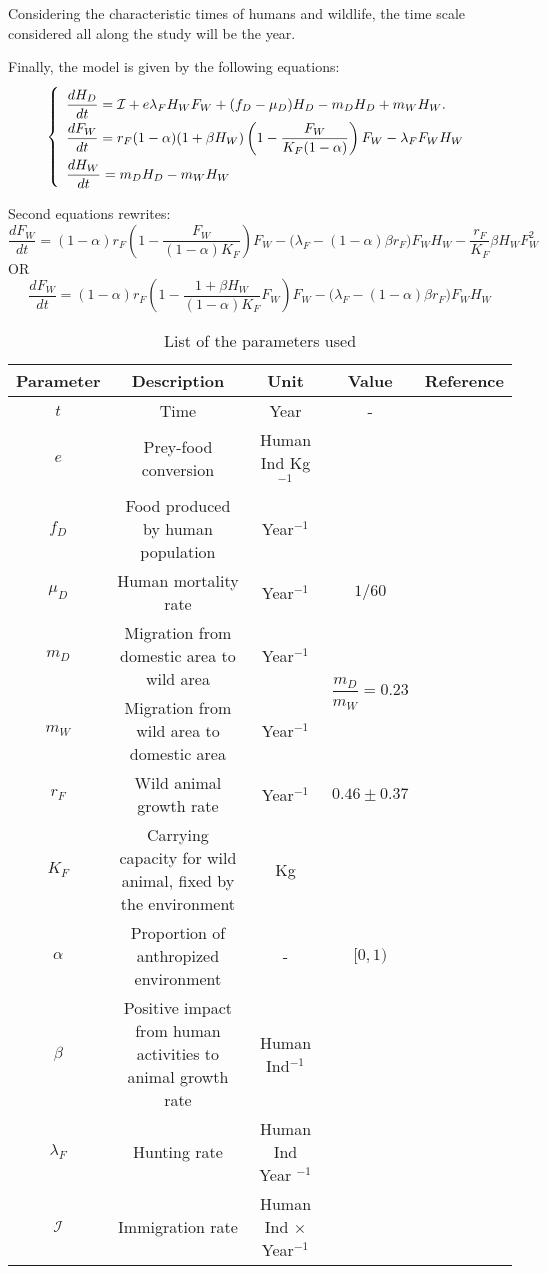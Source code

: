 \documentclass{article}
\newcommand{\lfw}{\lambda_{F}}
\newcommand{\lfw}{\lambda_{F}}
\newcommand{\cI}{\mathcal{I}}
\begin{document}
Considering the characteristic times of humans and wildlife, the time scale considered all along the study will be the year.
\medskip

Finally, the model is given by the following equations:
\begin{equation}
\def\arraystretch{2}
\left\{ 
\begin{array}{l}
\dfrac{dH_D}{dt}= \cI + e\lfw H_W F_W + (f_D - \mu_D) H_D - m_D H_D + m_W H_W. \\
\dfrac{dF_W}{dt} = r_F(1- \alpha) (1+ \beta H_W) \left(1 - \dfrac{F_W}{K_F(1-\alpha)} \right) F_W - \lfw F_W H_W \\
\dfrac{dH_W}{dt}= m_D H_D - m_W H_W 
\end{array} \right.
\label{equationsHDFWHW}
\end{equation}


Second equations rewrites:
$$
\dfrac{dF_W}{dt} = (1- \alpha)r_F \left(1 - \dfrac{F_W}{(1-\alpha)K_F} \right) F_W - \Big(\lfw - (1-\alpha) \beta r_F\Big) F_W H_W - \dfrac{r_F}{K_F} \beta H_W F_W^2
$$
OR
$$
\dfrac{dF_W}{dt} = (1- \alpha)r_F \left(1 - \dfrac{1 + \beta H_W}{(1-\alpha)K_F}F_W \right) F_W - \Big(\lfw - (1-\alpha) \beta r_F\Big) F_W H_W
$$

\begin{table}
\centering
\begin{tabular}{|c|c|c|c|c|}
\hline 
Parameter & Description & Unit & Value & Reference \\ 
\hline 
$t$ & Time & Year & -\\
$e$ & Prey-food conversion & Human Ind Kg $^{-1}$ & &\\
$f_D$ & Food produced by human population & Year$^{-1}$ &\\
$\mu_D$ & Human mortality rate  & Year$^{-1}$ & $1/60$ & \cite{ins_demographie}\\
$m_D$ & Migration from domestic area to wild area & Year$^{-1}$ & \multirow{2}{*}{$\dfrac{m_D}{m_W} = 0.23$} & \multirow{2}{*}{\cite{avila_interpreting_2019}}\\
$m_W$ & Migration from wild area to domestic area & Year$^{-1}$ &\\
$r_F$ & Wild animal growth rate & Year$^{-1}$ & $0.46 \pm 0.37$ &\\
$K_F$ & Carrying capacity for wild animal, fixed by the environment& Kg &\\
$\alpha$ & Proportion of anthropized environment & - & $[0, 1)$ &\\
$\beta$ & Positive impact from human activities to animal growth rate & Human Ind$^{-1}$ &  \\
$\lfw$ & Hunting rate & Human Ind Year $^{-1}$ & \\
$\mathcal{I}$ & Immigration rate & Human Ind $\times$ Year$^{-1}$ &\\
\hline
\end{tabular}
\caption{List of the parameters used}
\end{table}
\end{document}
